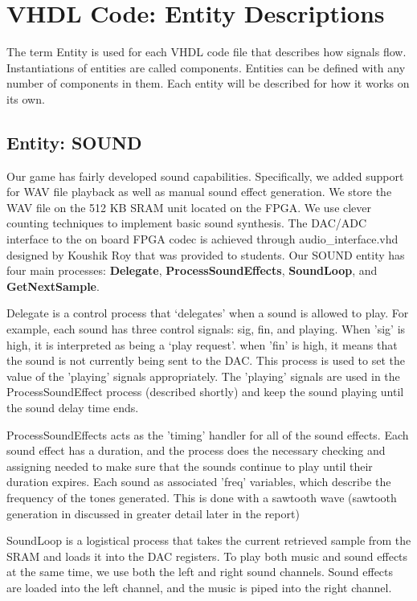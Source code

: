 \documentclass[10pt,a4paper]{article}
\begin{document}
\section{VHDL Code: Entity Descriptions}
The term Entity is used for each VHDL code file that describes how signals flow. Instantiations of entities are called components. Entities can be defined with any number of components in them. Each entity will be described for how it works on its own.

\subsection{Entity: SOUND}
Our game has fairly developed sound capabilities. Specifically, we added support for WAV file playback as well as manual sound effect generation. We store the WAV file on the 512 KB SRAM unit located on the FPGA. We use clever counting techniques to implement basic sound synthesis. The DAC/ADC interface to the on board FPGA codec is achieved through audio\_interface.vhd designed by Koushik Roy that was provided to students. Our SOUND entity has four main processes: \textbf{Delegate}, \textbf{ProcessSoundEffects}, \textbf{SoundLoop}, and \textbf{GetNextSample}.

Delegate is a control process that `delegates' when a sound is allowed to play. For example, each sound has three control signals: sig, fin, and playing. When 'sig' is high, it is interpreted as being a `play request'. when 'fin' is high, it means that the sound is not currently being sent to the DAC. This process is used to set the value of the 'playing' signals appropriately. The 'playing' signals are used in the ProcessSoundEffect process (described shortly) and keep the sound playing until the sound delay time ends.

ProcessSoundEffects acts as the 'timing' handler for all of the sound effects. Each sound effect has a duration, and the process does the necessary checking and assigning needed to make sure that the sounds continue to play until their duration expires. Each sound as associated 'freq' variables, which describe the frequency of the tones generated. This is done with a sawtooth wave (sawtooth generation in discussed in greater detail later in the report)

SoundLoop is a logistical process that takes the current retrieved sample from the SRAM and loads it into the DAC registers. To play both music and sound effects at the same time, we use both the left and right sound channels. Sound effects are loaded into the left channel, and the music is piped into the right channel.
\end{document}
